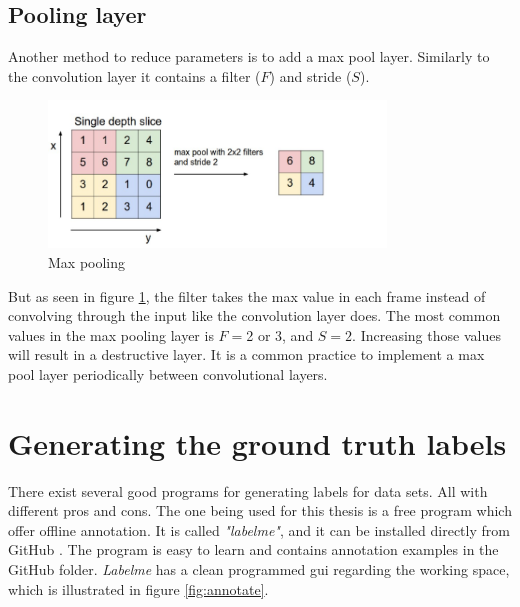\documentclass[USenglish]{ifimaster}  %
\begin{document}
\subsection{Pooling layer}
Another method to reduce parameters is to add a max pool layer. Similarly to the convolution layer it contains a filter ($F$) and stride ($S$). 

\begin{figure}[ht]
    \centering
    \includegraphics[width=0.8\textwidth]{bilder/max_pooling.png}
    \caption{Max pooling \cite{website:cs231n}}
    \label{fig:max_pooling}
\end{figure}

But as seen in figure \cref{fig:max_pooling}, the filter takes the max value in each frame instead of convolving through the input like the convolution layer does. The most common values in the max pooling layer is $F=$2 or 3, and $S=2$. Increasing those values will result in a destructive layer. It is a common practice to implement a max pool layer periodically between convolutional layers.

\section{Generating the ground truth labels}
There exist several good programs for generating labels for data sets. All with different pros and cons. The one being used for this thesis is a free program which offer offline annotation. It is called \textit{"labelme"}, and it can be installed directly from GitHub \cite{website:labelme}. The program is easy to learn and contains annotation examples in the GitHub folder. \textit{Labelme} has a clean programmed \ac{gui} regarding the working space, which is illustrated in figure \cref{fig:annotate}. 
\end{document}
